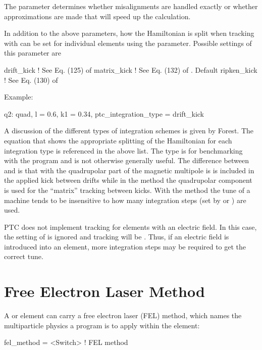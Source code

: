 The  parameter determines whether misalignments are handled exactly or
whether approximations are made that will speed up the calculation.

In addition to the above parameters, how the Hamiltonian is split when tracking with  can be
set for individual elements using the  parameter. Possible settings of this
parameter are
\begin{example}
  drift_kick    ! See Eq. (125) of \cite{b:geo.int}
  matrix_kick   ! See Eq. (132) of \cite{b:geo.int}. Default
  ripken_kick   ! See Eq. (130) of \cite{b:geo.int}
\end{example}
Example:
\begin{example}
  q2: quad, l = 0.6, k1 = 0.34, ptc_integration_type = drift_kick
\end{example}
A discussion of the different types of integration schemes is given by Forest\cite{b:geo.int}. The
equation that shows the appropriate splitting of the Hamiltonian for each integration type is
referenced in the above list. The  type is for benchmarking with the 
program and is not otherwise generally useful. The difference between  and
 is that with  the quadrupolar part of the magnetic multipole is is
included in the applied kick between drifts while in the  method the quadrupolar
component is used for the ``matrix'' tracking between kicks. With the  method the
tune of a machine tends to be insensitive to how many integration steps (set by  or
) are used.

PTC does not implement  tracking for elements with an electric field. In this case,
the setting of  is ignored and tracking will be . Thus, if
an electric field is introduced into an element, more integration steps may be required to get the
correct tune.

\section{Free Electron Laser Method}
\label{s:fel.meth}

A  or  element can carry a free electron laser (FEL) method, which
names the multiparticle physics a program is to apply within the element:
\begin{example}
  fel_method          = <Switch>   ! FEL method
\end{example}

